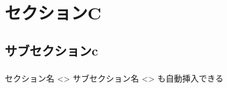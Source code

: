 \section{セクションC}
\subsection{サブセクションc}
\begin{frame}{}
  \frametitle{\insertsubsection}
  セクション名
  <\insertsection>
  サブセクション名
  <\insertsubsection>
  も自動挿入できる
\end{frame}
